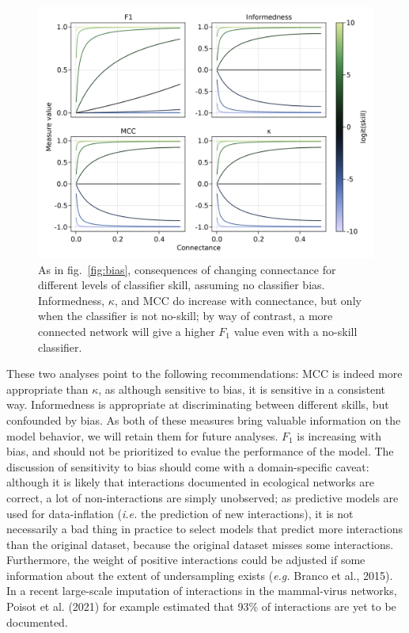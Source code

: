 \documentclass[11pt]{article}
\makeatletter
\def\maxwidth{\ifdim\Gin@nat@width>\linewidth\linewidth
\else\Gin@nat@width\fi}
\let\Oldincludegraphics\includegraphics
\renewcommand{\includegraphics}[1]{\Oldincludegraphics[width=\maxwidth]{#1}}
\makeatother
\begin{document}
\begin{figure}
\hypertarget{fig:connectance}{%
\centering
\includegraphics{figures/changing-connectance.png}
\caption{As in fig.~\ref{fig:bias}, consequences of changing connectance
for different levels of classifier skill, assuming no classifier bias.
Informedness, \(\kappa\), and MCC do increase with connectance, but only
when the classifier is not no-skill; by way of contrast, a more
connected network will give a higher \(F_1\) value even with a no-skill
classifier.}\label{fig:connectance}
}
\end{figure}

These two analyses point to the following recommendations: MCC is indeed
more appropriate than \(\kappa\), as although sensitive to bias, it is
sensitive in a consistent way. Informedness is appropriate at
discriminating between different skills, but confounded by bias. As both
of these measures bring valuable information on the model behavior, we
will retain them for future analyses. \(F_1\) is increasing with bias,
and should not be prioritized to evalue the performance of the model.
The discussion of sensitivity to bias should come with a domain-specific
caveat: although it is likely that interactions documented in ecological
networks are correct, a lot of non-interactions are simply unobserved;
as predictive models are used for data-inflation (\emph{i.e.} the
prediction of new interactions), it is not necessarily a bad thing in
practice to select models that predict more interactions than the
original dataset, because the original dataset misses some interactions.
Furthermore, the weight of positive interactions could be adjusted if
some information about the extent of undersampling exists (\emph{e.g.}
Branco et al., 2015). In a recent large-scale imputation of interactions
in the mammal-virus networks, Poisot et al. (2021) for example estimated
that 93\% of interactions are yet to be documented.
\end{document}
